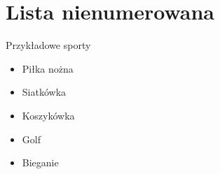 \section{Lista nienumerowana}
Przykładowe sporty
\begin{itemize}
    \item Piłka nożna
    \item Siatkówka
    \item Koszykówka
    \item Golf
    \item Bieganie
\end{itemize}